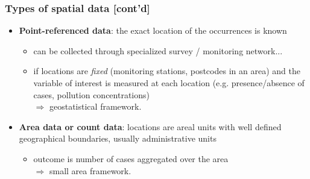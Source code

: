 \documentclass[slidestop,compress,serif,10pt]{beamer}
\begin{document}
\begin{frame}    \frametitle{Types of spatial data [cont'd]}
\begin{itemize}
\vfill  \item \textbf{Point-referenced data}: the exact location of the occurrences is known
        \begin{itemize}
\vfill        \item can be collected through specialized survey / monitoring network...
\vfill        \item if locations are \emph{fixed} (monitoring stations, postcodes in an area)
         and the variable of interest is measured at each location (e.g. presence/absence of cases, pollution concentrations)\\
         $\Rightarrow$ \alert{geostatistical framework.}
        \end{itemize}
        
\vfill  \item \textbf{Area data or count data}: locations are areal units with well defined geographical boundaries, usually administrative units
        \begin{itemize}
\vfill        \item outcome is number of cases aggregated over the area\\
$\Rightarrow$ \alert{small area framework.}
        \end{itemize}

\end{itemize}
\end{frame}
\end{document}
